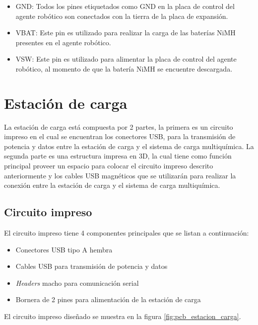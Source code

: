         \begin{itemize}
            \item GND: Todos los pines etiquetados como GND en la placa de control
            del agente robótico son conectados con la tierra de la placa de expansión.
            \item VBAT: Este pin es utilizado para realizar la carga de las baterías
            NiMH presentes en el agente robótico.
            \item VSW: Este pin es utilizado para alimentar la placa de 
            control del agente robótico, al momento de que la batería NiMH 
            se encuentre descargada.

        \end{itemize}

    
        


\chapter{Estación de carga}

La estación de carga está compuesta por 2 partes, la primera es un circuito impreso
en el cual se encuentran los conectores USB, para la transmisión de potencia y 
datos entre la estación de carga y el sistema de carga multiquímica. La segunda
parte es una estructura impresa en 3D, la cual tiene como función principal
proveer un espacio para colocar el circuito impreso descrito anteriormente y 
los cables USB magnéticos que se utilizarán para realizar la conexión entre
la estación de carga y el sistema de carga multiquímica.


\section{Circuito impreso}

El circuito impreso tiene 4 componentes principales que se listan a continuación:

\begin{itemize}
    \item Conectores USB tipo A hembra
    \item Cables USB para transmisión de potencia y datos
    \item \textit{Headers} macho para comunicación serial
    \item Bornera de 2 pines para alimentación de la estación de carga
\end{itemize}
El circuito impreso diseñado se muestra en la figura \ref{fig:pcb_estacion_carga}.


